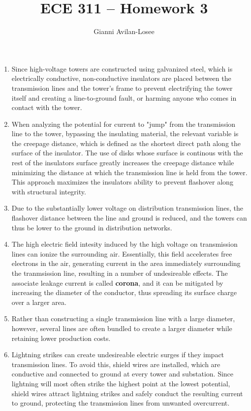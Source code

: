 \documentclass{article}
\title{ECE 311 -- Homework 3}
\author{Gianni Avilan-Losee}
\begin{document}

\begin{enumerate}[label=\thesubsection]
	\setcounter{section}{2}
	\setcounter{subsection}{7}
	\item Since high-voltage towers are constructed using galvanized steel, which is electrically conductive, non-conductive insulators are placed between the transmission lines and the tower's frame to prevent electrifying the tower itself and creating a line-to-ground fault, or harming anyone who comes in contact with the tower.
	\setcounter{subsection}{8}
	\item When analyzing the potential for current to "jump" from the transmission line to the tower, bypassing the insulating material, the relevant variable is the creepage distance, which is defined as the shortest direct path along the surface of the insulator. The use of disks whose surface is continous with the rest of the insulators surface greatly increases the creepage distance while minimizing the distance at which the transmission line is held from the tower. This approach maximizes the insulators ability to prevent flashover along with structural integrity.
	\setcounter{subsection}{11}
	\item Due to the substantially lower voltage on distribution transmission lines, the flashover distance between the line and ground is reduced, and the towers can thus be lower to the ground in distribution networks.
	\setcounter{subsection}{16}
\item The high electric field intesity induced by the high voltage on transmission lines can ionize the surrounding air. Essentially, this field accelerates free electrons in the air, generating current in the area immediately surrounding the tranmsission line, resulting in a number of undesireable effects. The associate leakage current is called \textbf{corona}, and it can be mitigated by increasing the diameter of the conductor, thus spreading its surface charge over a larger area. 
	\setcounter{subsection}{17}
  \item Rather than constructing a single transmission line with a large diameter, however, several lines are often bundled to create a larger diameter while retaining lower production costs.
	\setcounter{subsection}{19}
\item Lightning strikes can create undesireable electric surges if they impact transmission lines. To avoid this, shield wires are installed, which are conductive and connected to ground at every tower and substation. Since lightning will most often strike the highest point at the lowest potential, shield wires attract lightning strikes and safely conduct the resulting current to ground, protecting the transmission lines from unwanted overcurrent. 

\end{enumerate}
\end{document}
